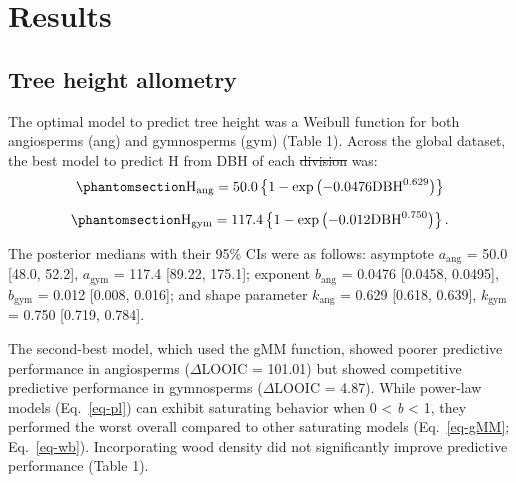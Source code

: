 \documentclass[
  12pt,
  letterpaper,
  DIV=11,
  numbers=noendperiod]{scrartcl}
\providecommand{\DIFadd}[1]{{\protect\color{blue}\uwave{#1}}} %
\providecommand{\DIFdel}[1]{{\protect\color{red}\sout{#1}}}                      %
\providecommand{\DIFaddbegin}{} %
\providecommand{\DIFaddend}{} %
\providecommand{\DIFdelbegin}{} %
\providecommand{\DIFdelend}{} %
\newcommand{\DIFscaledelfig}{0.5}
\newlength{\DIFdelgraphicswidth} %
\newlength{\DIFdelgraphicsheight} %
\newcommand{\DIFaddincludegraphics}[2][]{{\color{blue}\fbox{\DIFOincludegraphics[#1]{#2}}}} %
\newcommand{\DIFdelincludegraphics}[2][]{%
\sbox{\DIFdelgraphicsbox}{\DIFOincludegraphics[#1]{#2}}%
\settoboxwidth{\DIFdelgraphicswidth}{\DIFdelgraphicsbox} %
\settoboxtotalheight{\DIFdelgraphicsheight}{\DIFdelgraphicsbox} %
\scalebox{\DIFscaledelfig}{%
\parbox[b]{\DIFdelgraphicswidth}{\usebox{\DIFdelgraphicsbox}\\[-\baselineskip] \rule{\DIFdelgraphicswidth}{0em}}\llap{\resizebox{\DIFdelgraphicswidth}{\DIFdelgraphicsheight}{%
\setlength{\unitlength}{\DIFdelgraphicswidth}%
\begin{picture}(1,1)%
\thicklines\linethickness{2pt} %
{\color[rgb]{1,0,0}\put(0,0){\framebox(1,1){}}}%
{\color[rgb]{1,0,0}\put(0,0){\line( 1,1){1}}}%
{\color[rgb]{1,0,0}\put(0,1){\line(1,-1){1}}}%
\end{picture}%
}\hspace*{3pt}}} %
} %
\DeclareRobustCommand{\DIFaddbegin}{\DIFOaddbegin \let\includegraphics\DIFaddincludegraphics} %
\DeclareRobustCommand{\DIFaddend}{\DIFOaddend \let\includegraphics\DIFOincludegraphics} %
\DeclareRobustCommand{\DIFdelbegin}{\DIFOdelbegin \let\includegraphics\DIFdelincludegraphics} %
\DeclareRobustCommand{\DIFdelend}{\DIFOaddend \let\includegraphics\DIFOincludegraphics} %
\begin{document}
\section{Results}\label{results}

\subsection{Tree height allometry}\label{tree-height-allometry}

The optimal model to predict tree height was a Weibull function for both
angiosperms (ang) and gymnosperms (gym) (Table 1). Across the global
dataset, the best model to predict H from DBH of each \DIFdelbegin \DIFdel{division }\DIFdelend \DIFaddbegin \DIFadd{clade }\DIFaddend was:
\begin{equation}\phantomsection\label{eq-h_ang}{
\mathrm{H_{ang}} =50.0
\left\{ 1 - \exp\left( - 0.0476
\mathrm{DBH}^{0.629}
\right) \right\}
}\end{equation}

\begin{equation}\phantomsection\label{eq-h_gym}{
\mathrm{H_{gym}} = 117.4
\left\{ 1 - \exp\left( - 0.012
\mathrm{DBH}^{0.750}
\right) \right\}.
}\end{equation}

The posterior medians with their 95\% CIs were as follows: asymptote
\(a_{\text{ang}}\) = 50.0 {[}48.0, 52.2{]}, \(a_{\text{gym}}\) = 117.4
{[}89.22, 175.1{]}; exponent \(b_{\text{ang}}\) = 0.0476 {[}0.0458,
0.0495{]}, \(b_{\text{gym}}\) = 0.012 {[}0.008, 0.016{]}; and shape
parameter \(k_{\text{ang}}\) = 0.629 {[}0.618, 0.639{]},
\(k_{\text{gym}}\) = 0.750 {[}0.719, 0.784{]}.

The second-best model, which used the gMM function, showed poorer
predictive performance in angiosperms (\(\Delta\)LOOIC = 101.01) but
showed competitive predictive performance in gymnosperms
(\(\Delta\)LOOIC = 4.87). While power-law models (Eq.~\ref{eq-pl}) can
exhibit saturating behavior when 0 \textless{} \emph{b} \textless{} 1,
they performed the worst overall compared to other saturating models
(Eq.~\ref{eq-gMM}; Eq.~\ref{eq-wb}). Incorporating wood density did not
significantly improve predictive performance (Table 1).
\end{document}

